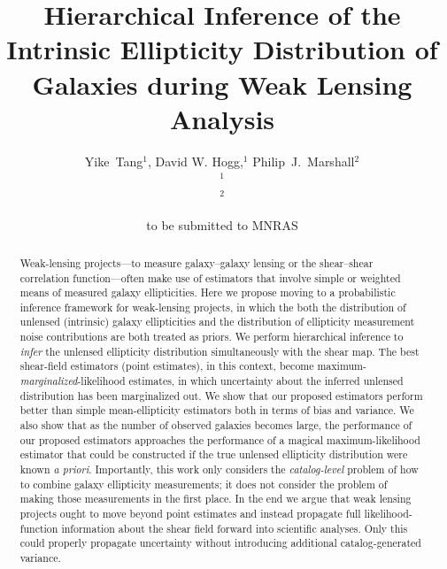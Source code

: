 \documentclass[useAMS,usenatbib]{mn2e}
\title[Hierarchical Inference in Weak Lensing]
{Hierarchical Inference of the Intrinsic Ellipticity
Distribution of Galaxies during Weak Lensing Analysis}
\author[Tang et al]{%
  Yike~Tang$^{1}$,
  David W. Hogg,$^{1}$
  Philip~J.~Marshall$^{2}$
  \medskip\\
  $^1$\nyu\\
  $^2$\oxford
}
\begin{document}
             
\date{to be submitted to MNRAS}
             
\pagerange{\pageref{firstpage}--\pageref{lastpage}}

\maketitle           

\label{firstpage}


\begin{abstract}
Weak-lensing projects---to measure galaxy--galaxy lensing or the shear--shear
correlation function---often make use of estimators that involve simple or weighted
means of measured galaxy ellipticities.  Here we propose moving to a probabilistic inference
framework for weak-lensing projects, in which the both the distribution of unlensed
(intrinsic) galaxy ellipticities and the distribution of ellipticity measurement noise contributions
are both treated as priors.  We perform hierarchical inference to \emph{infer} the
unlensed ellipticity distribution simultaneously with the shear map.  The best
shear-field estimators (point estimates), in this context, become
maximum-\emph{marginalized}-likelihood estimates, in which uncertainty about the
inferred unlensed distribution has been marginalized out.  We show that our proposed
estimators perform better than simple mean-ellipticity estimators both in terms of
bias and variance.  We also show that as the number of observed galaxies becomes
large, the performance of our proposed estimators approaches the performance of a
magical maximum-likelihood estimator that could be constructed if the true unlensed
ellipticity distribution were known \textit{a priori}.  Importantly, this work only
considers the \emph{catalog-level} problem of how to combine galaxy ellipticity
measurements; it does not consider the problem of making those measurements in the
first place.  In the end we argue that weak lensing projects ought to move beyond
point estimates and instead propagate full likelihood-function information about
the shear field forward into scientific analyses. Only this could properly
propagate uncertainty without introducing additional catalog-generated variance.
\end{abstract}

\end{document}
